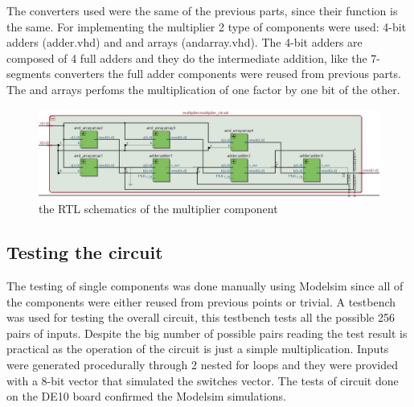 \documentclass[12pt]{article}
\begin{document}
The converters used were the same of the previous parts, since their function is the same.
For implementing the multiplier 2 type of components were used: 4-bit adders (adder.vhd) and and arrays (and\textunderscore array.vhd).
The 4-bit adders are composed of 4 full adders and they do the intermediate addition, like the 7-segments converters the full adder components were reused from previous parts.
The and arrays perfoms the multiplication of one factor by one bit of the other.
\begin{figure}[h]
	\centering
	\includegraphics[scale = 0.4]{immagini/RTL_multiplier.jpg}
	\caption{the RTL schematics of the multiplier component}       

\end{figure}
\subsection{Testing the circuit}
The testing of single components was done manually using Modelsim since all of the components were either reused from previous points or trivial. \newline
A testbench was used for testing the overall circuit, this testbench tests all the possible 256 pairs of inputs.
Despite the big number of possible pairs reading the test result is practical as the operation of the circuit is just a simple multiplication. \newline
Inputs were generated procedurally through 2 nested for loops and they were provided with a 8-bit vector that simulated the switches vector.\newline
The tests of circuit done on the DE10 board confirmed the Modelsim simulations.
\end{document}
